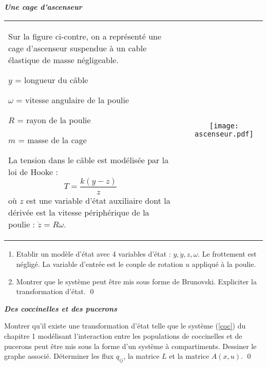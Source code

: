 \begin{exercice}{\bf \em Une cage d'ascenseur}

\begin{tabular}{p{6.5cm}p{2mm}c}
\vspace{-3.2cm} 
Sur la figure ci-contre, on a représenté une cage d'ascenseur suspendue à un cable élastique de masse négligeable.
\vspace{2mm}

\noindent {\bf Notations :}

$y$ = longueur du câble

$\omega$ = vitesse angulaire de la poulie

$R$ = rayon de la poulie

$m$ = masse de la cage

\vspace{2mm}
\noindent La tension dans le câble est modélisée par la loi de Hooke :
\begin{equation*}
T = \frac{k(y - z)}{z}
\end{equation*}
où $z$ est une variable d'état auxiliaire dont la dérivée est la vitesse périphérique de la poulie : $\dot z = R \omega$.
& &
\parbox[c]{6cm}
{\texttt{[image: ascenseur.pdf]}}
\end{tabular}

\begin{enumerate}
\item Etablir un modèle d'état avec 4 variables d'état : $y, \dot y, z, \omega$. Le frottement est négligé. La variable d'entrée est le couple de rotation $u$ appliqué à la poulie.
\item Montrer que le système peut être mis sous forme de Brunovski. Expliciter la transformation d'état. \qed
\end{enumerate}
\end{exercice}
\vv

\begin{exercice}{\bf \em Des coccinelles et des pucerons}

Montrer qu'il existe une transformation d'état telle que le système (\ref{coc}) du chapitre 1 modélisant l'interaction entre les populations de coccinelles et de pucerons peut être mis sous la forme d'un système à compartiments. Dessiner le graphe associé. Déterminer les flux $q_{ij}$, la matrice $L$ et la matrice $A(x,u)$. \qed
\end{exercice}
\vv

